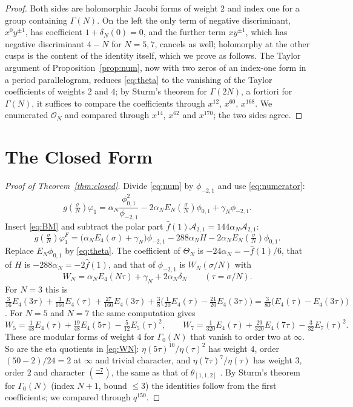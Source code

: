\documentclass[mathematics,article,submit,pdftex,oneauthor]{Definitions/mdpi}
\numberwithin{equation}{section}
\theoremstyle{plain}
\theoremstyle{remark}
\newcommand{\cO}{\mathcal{O}}
\newcommand{\cA}{\mathcal{A}}
\newcommand{\pmi}{\phi_{-2,1}}
\newcommand{\pz}{\phi_{0,1}}
\begin{document}
\begin{proof}
Both sides are holomorphic Jacobi forms of weight $2$ and index one for a group containing $\Gamma(N)$. On the left the only term of negative discriminant, $x^0y^{\pm1}$, has coefficient $1+\delta_N(0)=0$, and the further term $xy^{\pm1}$, which has negative discriminant $4-N$ for $N=5,7$, cancels as well; holomorphy at the other cusps is the content of the identity itself, which we prove as follows. The Taylor argument of Proposition~\ref{prop:num}, now with two zeros of an index-one form in a period parallelogram, reduces \eqref{eq:theta} to the vanishing of the Taylor coefficients of weights $2$ and $4$; by Sturm's theorem for $\Gamma(2N)$, a fortiori for $\Gamma(N)$, it suffices to compare the coefficients through $x^{12}$, $x^{60}$, $x^{168}$. We enumerated $\cO_N$ and compared through $x^{14}$, $x^{62}$ and $x^{170}$; the two sides agree.
\end{proof}

\section{The Closed Form}\label{sec:closed}

\begin{proof}[Proof of Theorem~\ref{thm:closed}]
Divide \eqref{eq:num} by $\pmi$ and use \eqref{eq:numerator}:
\[
g(\tfrac\sigma N)\varphi_1=\alpha_N\frac{\pz^2}{\pmi}-2\alpha_NE_N(\tfrac\sigma N)\pz+\gamma_N\pmi.
\]
Insert \eqref{eq:BM} and subtract the polar part $\hat f(1)\cA_{2,1}=144\alpha_N\cA_{2,1}$:
\[
g(\tfrac\sigma N)\varphi^F_1=\bigl(\alpha_NE_4(\sigma)+\gamma_N\bigr)\pmi-288\alpha_NH-2\alpha_NE_N(\tfrac\sigma N)\pz.
\]
Replace $E_N\pz$ by \eqref{eq:theta}. The coefficient of $\Theta_N$ is $-24\alpha_N=-\hat f(1)/6$, that of $H$ is $-288\alpha_N=-2\hat f(1)$, and that of $\pmi$ is $W_N(\sigma/N)$ with
\[
W_N=\alpha_NE_4(N\tau)+\gamma_N+2\alpha_N\delta_N\qquad(\tau=\sigma/N).
\]
For $N=3$ this is $\tfrac{3}{16}E_4(3\tau)+\tfrac3{160}E_4(\tau)+\tfrac{27}{160}E_4(3\tau)+\tfrac38\bigl(\tfrac1{20}E_4(\tau)-\tfrac{21}{20}E_4(3\tau)\bigr)=\tfrac3{80}\bigl(E_4(\tau)-E_4(3\tau)\bigr)$. For $N=5$ and $N=7$ the same computation gives
\[
W_5=\tfrac1{48}E_4(\tau)+\tfrac{19}{48}E_4(5\tau)-\tfrac5{12}E_5(\tau)^2,\qquad
W_7=\tfrac1{320}E_4(\tau)+\tfrac{29}{320}E_4(7\tau)-\tfrac{3}{32}E_7(\tau)^2.
\]
These are modular forms of weight $4$ for $\Gamma_0(N)$ that vanish to order two at $\infty$. So are the eta quotients in \eqref{eq:WN}: $\eta(5\tau)^{10}/\eta(\tau)^2$ has weight $4$, order $(50-2)/24=2$ at $\infty$ and trivial character, and $\eta(7\tau)^7/\eta(\tau)$ has weight $3$, order $2$ and character $\left(\frac{-7}{\cdot}\right)$, the same as that of $\theta_{[1,1,2]}$ \cite[Theorem~1.64]{Ono04}. By Sturm's theorem for $\Gamma_0(N)$ (index $N+1$, bound $\le3$) the identities follow from the first coefficients; we compared through $q^{150}$.
\end{proof}
\end{document}
